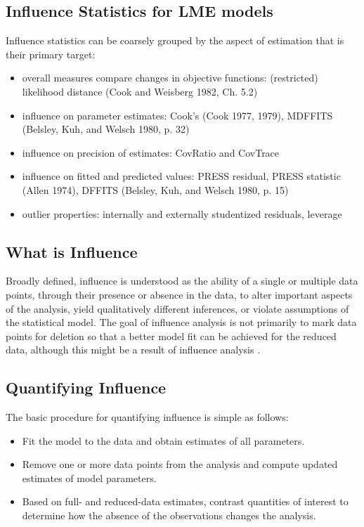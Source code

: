 \documentclass[12pt, a4paper]{article}
\begin{document}
	\subsection{Influence Statistics for LME models} %
	Influence statistics can be coarsely grouped by the aspect of estimation that is their primary target:
	\begin{itemize}
		\item overall measures compare changes in objective functions: (restricted) likelihood distance (Cook and Weisberg 1982, Ch. 5.2)
		\item influence on parameter estimates: Cook's  (Cook 1977, 1979), MDFFITS (Belsley, Kuh, and Welsch 1980, p. 32)
		\item influence on precision of estimates: CovRatio and CovTrace
		\item influence on fitted and predicted values: PRESS residual, PRESS statistic (Allen 1974), DFFITS (Belsley, Kuh, and Welsch 1980, p. 15)
		\item outlier properties: internally and externally studentized residuals, leverage
	\end{itemize}
	
	
	\subsection{What is Influence} %
	
	Broadly defined, influence is understood as the ability of a single or multiple data points, through their presence or absence in the data, to alter important aspects of the analysis, yield qualitatively different inferences, or violate assumptions of the statistical model. The goal of influence analysis is not primarily to mark data
	points for deletion so that a better model fit can be achieved for the reduced data, although this might be a result of influence analysis \citep{schabenberger}.
	
	\subsection{Quantifying Influence}  %
	
	The basic procedure for quantifying influence is simple as follows:
	
	\begin{itemize}
		\item Fit the model to the data and obtain estimates of all parameters.
		\item Remove one or more data points from the analysis and compute updated estimates of model parameters.
		\item Based on full- and reduced-data estimates, contrast quantities of interest to determine how the absence of the observations changes the analysis.
	\end{itemize}
	
\end{document}
